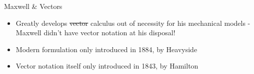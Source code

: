 \documentclass{beamer}
\begin{document}

\begin{frame}{Maxwell \& Vectors}
	\begin{itemize}
		\item Greatly develops \sout{vector} calculus out of necessity for his mechanical models {\color{mEm}- Maxwell didn't have vector notation at his disposal!}
		\item Modern formulation only introduced in 1884, by Heavyside{ \autocite{heavyside}}
		\item Vector notation itself only introduced in 1843, by Hamilton \autocite{vecanal}
	\end{itemize}
\end{frame}
\end{document}
